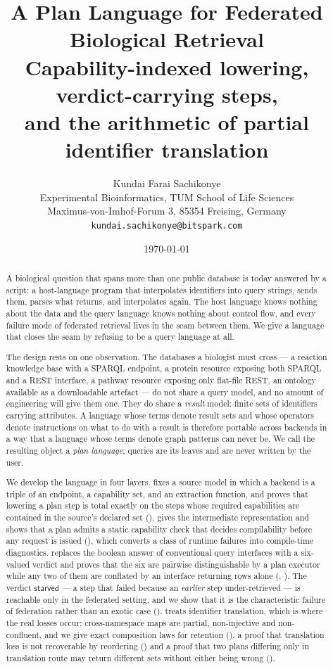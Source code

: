 \documentclass[11pt,a4paper]{article}
\title{\textbf{A Plan Language for Federated Biological Retrieval}\\[0.4em]
\large Capability-indexed lowering, verdict-carrying steps,\\
and the arithmetic of partial identifier translation}
\author{%
Kundai Farai Sachikonye\\[0.3em]
\normalsize Experimental Bioinformatics, TUM School of Life Sciences\\
\normalsize Maximus-von-Imhof-Forum 3, 85354 Freising, Germany\\
\normalsize \texttt{kundai.sachikonye@bitspark.com}}
\date{\today}
\theoremstyle{plain}
\theoremstyle{definition}
\theoremstyle{remark}
\newcommand{\vstarve}{\textsf{starved}}
\begin{document}
\maketitle

\begin{abstract}
A biological question that spans more than one public database is today
answered by a script: a host-language program that interpolates identifiers
into query strings, sends them, parses what returns, and interpolates again.
The host language knows nothing about the data and the query language knows
nothing about control flow, and every failure mode of federated retrieval lives
in the seam between them. We give a language that closes the seam by refusing
to be a query language at all.

The design rests on one observation. The databases a biologist must cross ---
a reaction knowledge base with a SPARQL endpoint, a protein resource exposing
both SPARQL and a REST interface, a pathway resource exposing only flat-file
REST, an ontology available as a downloadable artefact --- do not share a query
model, and no amount of engineering will give them one. They do share a
\emph{result} model: finite sets of identifiers carrying attributes. A language
whose terms denote result sets and whose operators denote instructions on what
to do with a result is therefore portable across backends in a way that a
language whose terms denote graph patterns can never be. We call the resulting
object a \emph{plan language}; queries are its leaves and are never written by
the user.

We develop the language in four layers.  fixes a source model
in which a backend is a triple of an endpoint, a capability set, and an
extraction function, and proves that lowering a plan step is total exactly on
the steps whose required capabilities are contained in the source's declared
set ().  gives the intermediate representation
and shows that a plan admits a static capability check that decides
compilability before any request is issued (), which converts
a class of runtime failures into compile-time diagnostics.
 replaces the boolean answer of conventional query
interfaces with a six-valued verdict and proves that the six are pairwise
distinguishable by a plan executor while any two of them are conflated by an
interface returning rows alone (, ). The
verdict $\vstarve$ --- a step that failed because an \emph{earlier} step
under-retrieved --- is reachable only in the federated setting, and we show
that it is the characteristic failure of federation rather than an exotic case
().
 treats identifier translation, which is where the real
losses occur: cross-namespace maps are partial, non-injective and
non-confluent, and we give exact composition laws for retention
(), a proof that translation loss is not recoverable by
reordering () and a proof that two plans differing only in
translation route may return different sets without either being wrong
().


\end{abstract}
\end{document}
